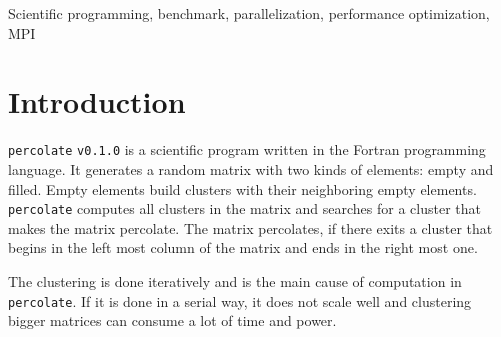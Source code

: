 \documentclass[twoside,11pt]{article}
\title{\titl}
\author{}
\def\perc{\texttt{perco\-late}}
\def\v{\texttt{v0.1.0}}
\begin{document}
\maketitle

\begin{abstract}
This paper describes an optimized version of \perc{} \v{}.
\perc{} is a scientific program, which generates a random
matrix with two kinds of elements: empty and filled.
Empty elements build clusters with their neighboring empty
elements and \perc{} finds clusters that begin at the first
column and end at the last.
If such a cluster exists, the matrix percolates.

\perc{} performs a very costly clustering operation,
wherefore the need for a faster solution arises.

This paper describes the clustering operation and
demonstrates its poor performance, by analyzing its best
case time complexity, before going into detail about how
MPI was used for parallelizing \perc{} and how its
correctness is tested with a regression test suite.
Also, a benchmark is presented, which successfully shows
the performance benefits of the parallel version and its
scalability.
The results of the benchmark are presented and discussed
in this paper, before at last a conclusion is drawn.

\end{abstract}

\begin{keywords}
Scientific programming, benchmark, parallelization,
performance optimization, MPI
\end{keywords}

\section{Introduction} %

\perc{} \v{} is a scientific program written in the Fortran
programming language. It generates a random matrix with two
kinds of elements: empty and filled. Empty elements build
clusters with their neighboring empty elements.
\perc{} computes all clusters in the matrix and searches
for a cluster that makes the matrix percolate.
The matrix percolates, if there exits a cluster that begins
in the left most column of the matrix and ends in the right
most one.

The clustering is done iteratively and is the main cause of
computation in \perc{}.
If it is done in a serial way, it does not
scale well and clustering bigger matrices can consume a
lot of time and power.
\end{document}
